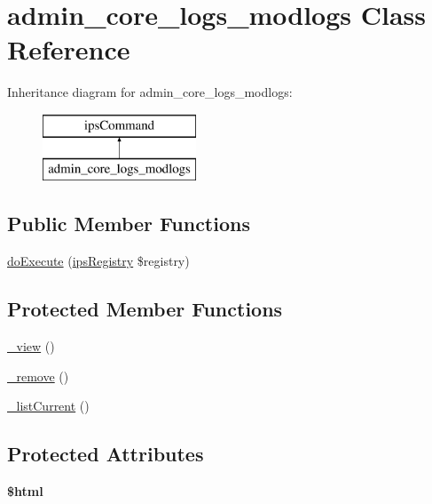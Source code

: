 \hypertarget{classadmin__core__logs__modlogs}{\section{admin\-\_\-core\-\_\-logs\-\_\-modlogs Class Reference}
\label{classadmin__core__logs__modlogs}
}
Inheritance diagram for admin\-\_\-core\-\_\-logs\-\_\-modlogs\-:\begin{figure}[H]
\begin{center}
\leavevmode
\includegraphics[height=2.000000cm]{classadmin__core__logs__modlogs}
\end{center}
\end{figure}
\subsection*{Public Member Functions}
\begin{DoxyCompactItemize}
\item 
\hyperlink{classadmin__core__logs__modlogs_afbc4e912a0604b94d47d66744c64d8ba}{do\-Execute} (\hyperlink{classips_registry}{ips\-Registry} \$registry)
\end{DoxyCompactItemize}
\subsection*{Protected Member Functions}
\begin{DoxyCompactItemize}
\item 
\hyperlink{classadmin__core__logs__modlogs_aecb3513e402840411fb3737f4f2d3193}{\-\_\-view} ()
\item 
\hyperlink{classadmin__core__logs__modlogs_a6e3a0c448dcfd8610c6ddf42c6c660aa}{\-\_\-remove} ()
\item 
\hyperlink{classadmin__core__logs__modlogs_abc03e9ca0857dea04554a012ac374f5a}{\-\_\-list\-Current} ()
\end{DoxyCompactItemize}
\subsection*{Protected Attributes}
\begin{DoxyCompactItemize}
\item 
\hypertarget{classadmin__core__logs__modlogs_a6f96e7fc92441776c9d1cd3386663b40}{{\bfseries \$html}}\label{classadmin__core__logs__modlogs_a6f96e7fc92441776c9d1cd3386663b40}

\end{DoxyCompactItemize}
